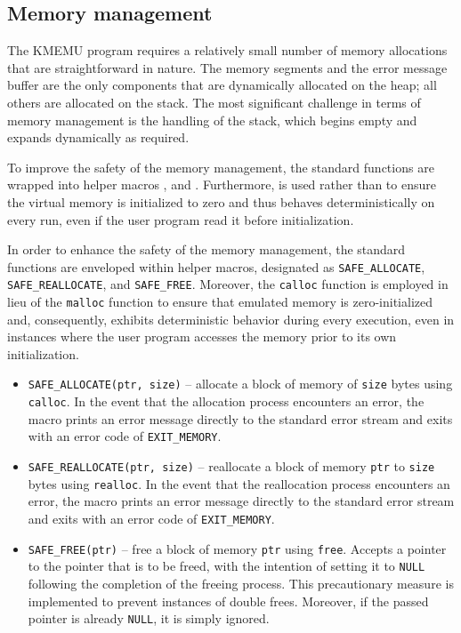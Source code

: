 \documentclass[10pt,a4paper,final]{article}
\newcommand{\code}[1]{\texttt{#1}}
\begin{document}
\subsection{Memory management}

The KMEMU program requires a relatively small number of memory allocations that
are straightforward in nature. The memory segments and the error message buffer
are the only components that are dynamically allocated on the heap; all others
are allocated on the stack. The most significant challenge in terms of memory
management is the handling of the stack, which begins empty and expands
dynamically as required.

To improve the safety of the memory management, the standard functions are
wrapped into helper macros ,  and
. Furthermore,  is used rather than 
to ensure the virtual memory is initialized to zero and thus behaves
deterministically on every run, even if the user program read it before
initialization.

In order to enhance the safety of the memory management, the standard functions
are enveloped within helper macros, designated as \code{SAFE_ALLOCATE},
\code{SAFE_REALLOCATE}, and \code{SAFE_FREE}. Moreover, the \code{calloc}
function is employed in lieu of the \code{malloc} function to ensure that
emulated memory is zero-initialized and, consequently, exhibits deterministic
behavior during every execution, even in instances where the user program
accesses the memory prior to its own initialization.

\begin{itemize}
    \item \code{SAFE_ALLOCATE(ptr, size)} -- allocate a block of memory of
        \code{size} bytes using \code{calloc}. In the event that the allocation
        process encounters an error, the macro prints an error message directly
        to the standard error stream and exits with an error code of
        \code{EXIT_MEMORY}.
    \item \code{SAFE_REALLOCATE(ptr, size)} -- reallocate a block of memory
        \code{ptr} to \code{size} bytes using \code{realloc}. In the event that
        the reallocation process encounters an error, the macro prints an
        error message directly to the standard error stream and exits with an
        error code of \code{EXIT_MEMORY}.
    \item \code{SAFE_FREE(ptr)} -- free a block of memory \code{ptr} using
        \code{free}. Accepts a pointer to the pointer that is to be freed, with
        the intention of setting it to \code{NULL} following the completion of
        the freeing process. This precautionary measure is implemented to
        prevent instances of double frees. Moreover, if the passed pointer is
        already \code{NULL}, it is simply ignored.
\end{itemize}
\end{document}
